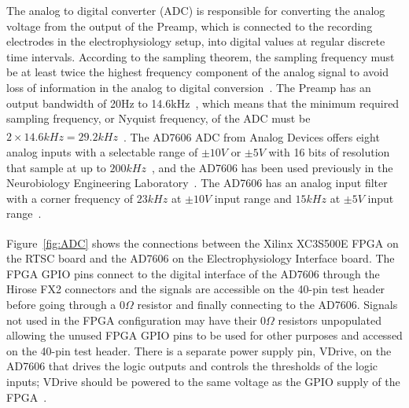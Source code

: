 The analog to digital converter (ADC) is responsible for converting the analog voltage from the output of the Preamp, which is connected to the recording electrodes in the electrophysiology setup, into digital values at regular discrete time intervals.  According to the sampling theorem, the sampling frequency must be at least twice the highest frequency component of the analog signal to avoid loss of information in the analog to digital conversion~\cite{AlexanderSadiku2004}.  The Preamp has an output bandwidth of 20\unit{Hz} to 14.6\unit{kHz}~\cite{StahlMSEE}, which means that the minimum required sampling frequency, or Nyquist frequency, of the ADC must be $2\times14.6\unit{kHz}=29.2\unit{kHz}$~\cite{AlexanderSadiku2004}.  The AD7606 ADC from Analog Devices\textsuperscript{\textregistered} offers eight analog inputs with a selectable range of $\pm 10\unit{V}$ or $\pm 5\unit{V}$ with 16 bits of resolution that sample at up to $200\unit{kHz}$~\cite{AD7606ds}, and the AD7606 has been used previously in the Neurobiology Engineering Laboratory~\cite{BatzerCorsiCrampton}.  The AD7606 has an analog input filter with a corner frequency of $23\unit{kHz}$ at $\pm 10\unit{V}$ input range and $15\unit{kHz}$ at $\pm 5\unit{V}$ input range~\cite{BatzerCorsiCrampton}.

Figure~\ref{fig:ADC} shows the connections between the Xilinx\textsuperscript{\textregistered} XC3S500E FPGA on the RTSC board and the AD7606 on the Electrophysiology Interface board.  The FPGA GPIO pins connect to the digital interface of the AD7606 through the Hirose FX2 connectors and the signals are accessible on the 40-pin test header before going through a $0\unit{\Omega}$ resistor and finally connecting to the AD7606.  Signals not used in the FPGA configuration may have their $0\unit{\Omega}$ resistors unpopulated allowing the unused FPGA GPIO pins to be used for other purposes and accessed on the 40-pin test header.  There is a separate power supply pin, VDrive, on the AD7606 that drives the logic outputs and controls the thresholds of the logic inputs; VDrive should be powered to the same voltage as the GPIO supply of the FPGA~\cite{AD7606ds}.

